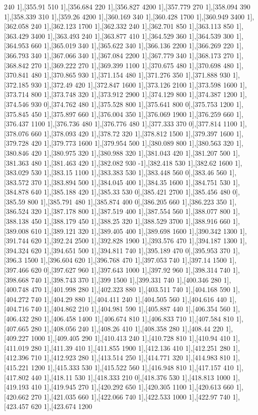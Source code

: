 {240 1],[355.91 510 1],[356.684 220 1],[356.827 4200 1],[357.779 270 1],[358.094 390 1],[358.339 310 1],[359.26 4200 1],[360.169 340 1],[360.428 1700 1],[360.949 3400 1],[362.058 240 1],[362.123 1700 1],[362.332 240 1],[362.701 850 1],[363.113 850 1],[363.429 3400 1],[363.493 240 1],[363.877 410 1],[364.529 360 1],[364.539 300 1],[364.953 660 1],[365.019 340 1],[365.622 340 1],[366.136 2200 1],[366.269 220 1],[366.793 340 1],[367.066 340 1],[367.084 2200 1],[367.779 340 1],[368.173 270 1],[368.842 270 1],[369.222 270 1],[369.399 1100 1],[370.675 480 1],[370.698 480 1],[370.841 480 1],[370.865 930 1],[371.154 480 1],[371.276 350 1],[371.888 930 1],[372.185 930 1],[372.49 420 1],[372.847 1600 1],[373.126 2100 1],[373.598 1600 1],[373.714 800 1],[373.748 320 1],[373.912 2900 1],[374.129 800 1],[374.387 1200 1],[374.546 930 0],[374.762 480 1],[375.528 800 1],[375.641 800 0],[375.753 1200 1],[375.845 450 1],[375.897 660 1],[376.004 350 1],[376.069 1900 1],[376.259 660 1],[376.437 1100 1],[376.736 480 1],[376.776 480 1],[377.333 370 0],[377.814 1100 1],[378.076 660 1],[378.093 420 1],[378.72 320 1],[378.812 1500 1],[379.397 1600 1],[379.728 420 1],[379.773 1600 1],[379.954 500 1],[380.089 800 1],[380.563 320 1],[380.846 420 1],[380.975 320 1],[380.988 320 1],[381.043 420 1],[381.207 500 1],[381.363 480 1],[381.463 420 1],[382.082 930 -1],[382.418 530 1],[382.62 1600 1],[383.029 530 1],[383.15 1100 1],[383.383 530 1],[383.448 560 0],[383.46 560 1],[383.572 370 1],[383.894 500 1],[384.045 400 1],[384.35 1600 1],[384.751 530 1],[384.878 640 1],[385.188 420 1],[385.33 530 0],[385.421 2700 1],[385.456 480 0],[385.59 800 1],[385.791 480 1],[385.874 400 0],[386.205 660 1],[386.223 350 1],[386.524 320 1],[387.178 800 1],[387.519 400 1],[387.554 560 1],[388.077 800 1],[388.138 450 1],[388.179 450 1],[388.25 320 1],[388.529 3700 1],[388.916 660 1],[389.008 610 1],[389.121 320 1],[389.405 400 1],[389.698 1600 1],[390.342 1300 1],[391.744 620 1],[392.24 2500 1],[392.828 1900 1],[393.576 470 1],[394.187 1300 1],[394.324 620 1],[394.651 500 1],[394.811 740 1],[395.189 470 0],[395.953 370 1],[396.3 1500 1],[396.604 620 1],[396.768 470 1],[397.053 740 1],[397.14 1500 1],[397.466 620 0],[397.627 960 1],[397.643 1000 1],[397.92 960 1],[398.314 740 1],[398.668 740 1],[398.743 370 1],[399 1500 1],[399.331 740 1],[400.346 280 1],[400.748 470 1],[401.998 280 1],[402.323 880 1],[403.511 740 1],[404.168 590 1],[404.272 740 1],[404.29 880 1],[404.411 240 1],[404.505 560 1],[404.616 440 1],[404.716 740 1],[404.862 210 1],[404.981 590 1],[405.887 440 1],[406.354 560 1],[406.432 280 1],[406.458 1400 1],[406.674 810 1],[406.833 710 1],[407.584 810 1],[407.665 280 1],[408.056 240 1],[408.26 410 1],[408.358 280 1],[408.44 220 1],[409.227 1000 1],[409.405 290 1],[410.413 240 1],[410.728 810 1],[410.94 410 1],[411.019 280 1],[411.39 410 1],[411.855 1900 1],[412.136 410 1],[412.251 280 1],[412.396 710 1],[412.923 280 1],[413.514 250 1],[414.771 320 1],[414.983 810 1],[415.221 1200 1],[415.333 530 1],[415.522 560 1],[416.948 810 1],[417.157 410 1],[417.802 440 1],[418.11 530 1],[418.333 210 0],[418.376 530 1],[418.813 1000 1],[419.193 410 1],[419.945 270 1],[420.292 650 1],[420.305 1100 1],[420.613 660 1],[420.662 270 1],[421.035 660 1],[422.066 740 1],[422.533 1000 1],[422.97 740 1],[423.457 620 1],[423.674 1200 }
